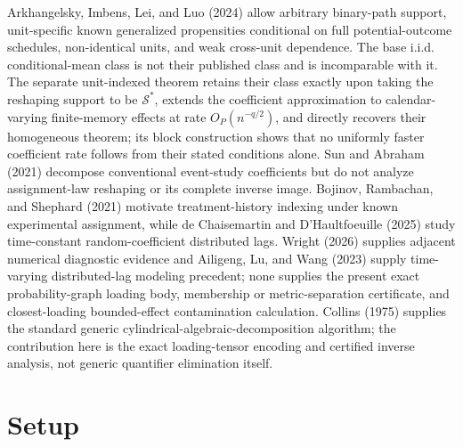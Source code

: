 \documentclass{article}
\begin{document}
Arkhangelsky, Imbens, Lei, and Luo (2024) allow arbitrary binary-path support, unit-specific known generalized propensities conditional on full potential-outcome schedules, non-identical units, and weak cross-unit dependence. The base i.i.d. conditional-mean class is not their published class and is incomparable with it. The separate unit-indexed theorem retains their class exactly upon taking the reshaping support to be \(\mathcal S^*\), extends the coefficient approximation to calendar-varying finite-memory effects at rate \(O_P(n^{-q/2})\), and directly recovers their homogeneous theorem; its block construction shows that no uniformly faster coefficient rate follows from their stated conditions alone. Sun and Abraham (2021) decompose conventional event-study coefficients but do not analyze assignment-law reshaping or its complete inverse image. Bojinov, Rambachan, and Shephard (2021) motivate treatment-history indexing under known experimental assignment, while de Chaisemartin and D'Haultfoeuille (2025) study time-constant random-coefficient distributed lags. Wright (2026) supplies adjacent numerical diagnostic evidence and Ailigeng, Lu, and Wang (2023) supply time-varying distributed-lag modeling precedent; none supplies the present exact probability-graph loading body, membership or metric-separation certificate, and closest-loading bounded-effect contamination calculation. Collins (1975) supplies the standard generic cylindrical-algebraic-decomposition algorithm; the contribution here is the exact loading-tensor encoding and certified inverse analysis, not generic quantifier elimination itself.

\section{Setup}
\end{document}
